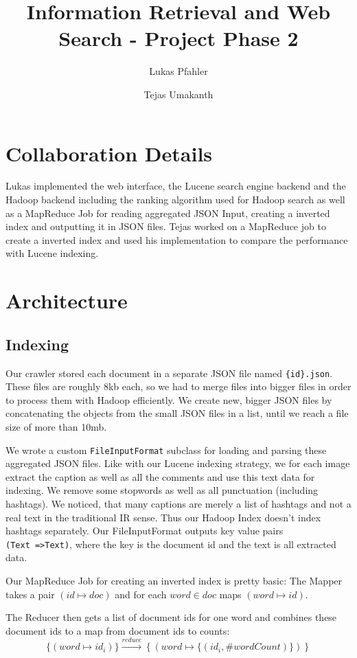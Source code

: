 \documentclass[11pt]{article}
\title{Information Retrieval and Web Search - Project Phase 2}
\author{Lukas Pfahler \and Tejas Umakanth}
\begin{document}
\maketitle
\section{Collaboration Details}	
	Lukas implemented the web interface, the Lucene search engine backend and the Hadoop backend including the ranking algorithm used for Hadoop search as well as a MapReduce Job for reading aggregated JSON Input, creating a inverted index and outputting it in JSON files. Tejas worked on a MapReduce job to create a inverted index and used his implementation to compare the performance with Lucene indexing.
\section{Architecture}
	\subsection{Indexing}
		Our crawler stored each document in a separate JSON file named \texttt{\{id\}.json}. These files are roughly 8kb each, so we had to merge files into bigger files in order to process them with Hadoop efficiently. We create new, bigger JSON files by concatenating the objects from the small JSON files in a list, until we reach a file size of more than 10mb.

		We wrote a custom \texttt{FileInputFormat} subclass for loading and parsing these aggregated JSON files. Like with our Lucene indexing strategy, we for each image extract the caption as well as all the comments and use this text data for indexing. We remove some stopwords as well as all punctuation (including hashtags). We noticed, that many captions are merely a list of hashtags and not a real text in the traditional IR sense. Thus our Hadoop Index doesn't index hashtags separately. Our FileInputFormat outputs key value pairs \texttt{({Text~=>Text})}, where the key is the document id and the text is all extracted data.

		Our MapReduce Job for creating an inverted index is pretty basic: The Mapper takes a pair $(id \mapsto doc)$ and for  each $word \in doc$ maps $(word \mapsto id)$.

		The Reducer then gets a list of document ids for one word and combines these document ids to a map from document ids to counts: $$\{(word \mapsto id_i)\} \xrightarrow{reduce} \left\{\left(word \mapsto \{(id_i,\#wordCount)\}\right)\right\}$$%
\end{document}
